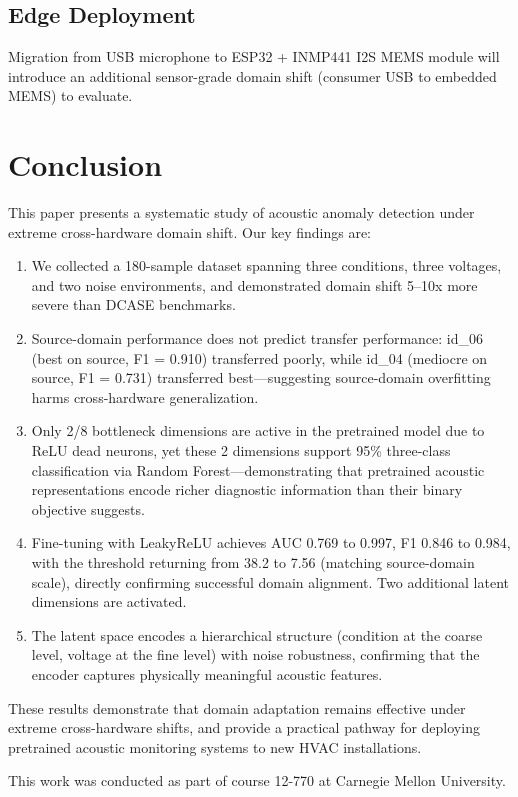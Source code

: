 \documentclass[sigconf]{acmart}
\begin{document}
\subsection{Edge Deployment}

Migration from USB microphone to ESP32 + INMP441 I2S MEMS module will introduce an additional sensor-grade domain shift (consumer USB to embedded MEMS) to evaluate.


\section{Conclusion}

This paper presents a systematic study of acoustic anomaly detection under extreme cross-hardware domain shift. Our key findings are:

\begin{enumerate}
\item We collected a 180-sample dataset spanning three conditions, three voltages, and two noise environments, and demonstrated domain shift 5--10x more severe than DCASE benchmarks.
\item Source-domain performance does not predict transfer performance: id\_06 (best on source, F1 = 0.910) transferred poorly, while id\_04 (mediocre on source, F1 = 0.731) transferred best---suggesting source-domain overfitting harms cross-hardware generalization.
\item Only 2/8 bottleneck dimensions are active in the pretrained model due to ReLU dead neurons, yet these 2 dimensions support 95\% three-class classification via Random Forest---demonstrating that pretrained acoustic representations encode richer diagnostic information than their binary objective suggests.
\item Fine-tuning with LeakyReLU achieves AUC 0.769 to 0.997, F1 0.846 to 0.984, with the threshold returning from 38.2 to 7.56 (matching source-domain scale), directly confirming successful domain alignment. Two additional latent dimensions are activated.
\item The latent space encodes a hierarchical structure (condition at the coarse level, voltage at the fine level) with noise robustness, confirming that the encoder captures physically meaningful acoustic features.
\end{enumerate}

These results demonstrate that domain adaptation remains effective under extreme cross-hardware shifts, and provide a practical pathway for deploying pretrained acoustic monitoring systems to new HVAC installations.

\begin{acks}
This work was conducted as part of course 12-770 at Carnegie Mellon University.
\end{acks}



\end{document}
